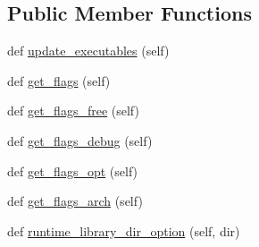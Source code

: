\subsection*{Public Member Functions}
\begin{DoxyCompactItemize}
\item 
def \hyperlink{classnumpy_1_1distutils_1_1fcompiler_1_1intel_1_1IntelVisualFCompiler_abff64905529fca881e45522df8c857a9}{update\+\_\+executables} (self)
\item 
def \hyperlink{classnumpy_1_1distutils_1_1fcompiler_1_1intel_1_1IntelVisualFCompiler_a5b14854b4f1c209a8f9b7d68a5a9e315}{get\+\_\+flags} (self)
\item 
def \hyperlink{classnumpy_1_1distutils_1_1fcompiler_1_1intel_1_1IntelVisualFCompiler_a9e5bb27ff15dfeb5885f97f68fb3c323}{get\+\_\+flags\+\_\+free} (self)
\item 
def \hyperlink{classnumpy_1_1distutils_1_1fcompiler_1_1intel_1_1IntelVisualFCompiler_aeb5eeef5787dad6882f57df442bfcc8c}{get\+\_\+flags\+\_\+debug} (self)
\item 
def \hyperlink{classnumpy_1_1distutils_1_1fcompiler_1_1intel_1_1IntelVisualFCompiler_a2aca71f425f03ba142693394d6d9b76d}{get\+\_\+flags\+\_\+opt} (self)
\item 
def \hyperlink{classnumpy_1_1distutils_1_1fcompiler_1_1intel_1_1IntelVisualFCompiler_a292070a3ecac3d863533df0b924a9d8e}{get\+\_\+flags\+\_\+arch} (self)
\item 
def \hyperlink{classnumpy_1_1distutils_1_1fcompiler_1_1intel_1_1IntelVisualFCompiler_a5a710652d06d25a1aec775b7a8c77e7f}{runtime\+\_\+library\+\_\+dir\+\_\+option} (self, dir)
\end{DoxyCompactItemize}

